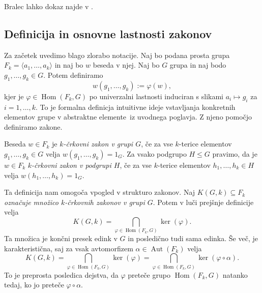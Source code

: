 Bralec lahko dokaz najde v \cite[str.~5--8]{Lyndon_Schupp_2015}.

\subsection{Definicija in osnovne lastnosti zakonov}\label{sec_osnovne_lastnosti_zakonov}

Za začetek uvedimo blago zlorabo notacije. Naj bo podana prosta grupa $F_k = \langle a_1, \ldots, a_k \rangle$ in naj bo $w$ beseda v njej.
Naj bo $G$ grupa in naj bodo $g_1, \ldots, g_k \in G$. Potem definiramo \begin{equation*}
    w(g_1, \ldots, g_k) := \varphi(w),
\end{equation*}
kjer je $\varphi \in \operatorname{Hom}(F_k, G)$ po univerzalni lastnosti induciran s slikami $a_i \mapsto g_i$ za $i = 1, \ldots, k$.
To je formalna definicja intuitivne ideje \glqq vstavljanja konkretnih elementov grupe v abstraktne elemente\grqq~iz uvodnega poglavja. Z njeno pomočjo definiramo zakone.

\begin{definicija}\label{def_zakon_formalna}
    Beseda $w \in F_k$ je \emph{$k$-črkovni zakon v grupi $G$}, če za vse $k$-terice elementov $g_1, \ldots, g_k \in G$ velja $w(g_1, \ldots, g_k) = 1_G$.
    Za vsako podgrupo $H \le G$ pravimo, da je $w \in F_k$ \emph{$k$-črkovni zakon v podgrupi $H$}, če za vse $k$-terice elementov $h_1, \ldots, h_k \in H$ velja $w(h_1, \ldots, h_k) = 1_G$.
\end{definicija}

Ta definicija nam omogoča vpogled v strukturo zakonov. Naj \emph{$K(G, k) \subseteq F_k$ označuje množico $k$-črkovnih zakonov v grupi $G$}. Potem v luči prejšnje definicije velja
\begin{equation*}
K(G, k)  = \bigcap_{\varphi \in \operatorname{Hom}(F_k, G)} \ker(\varphi).   
\end{equation*}  
Ta množica je končni presek edink v $G$ in posledično tudi sama edinka. Še več, je karakteristična, saj za vsak avtomorfizem $\alpha \in \operatorname{Aut}(F_k)$ velja
\begin{equation*}
    K(G, k)  = \bigcap_{\varphi \in \operatorname{Hom}(F_k, G)} \ker(\varphi) = \bigcap_{\varphi \in \operatorname{Hom}(F_k, G)} \ker(\varphi \circ \alpha). 
\end{equation*}  
To je preprosta posledica dejstva, da $\varphi$ preteče grupo $\operatorname{Hom}(F_k, G)$ natanko tedaj, ko jo preteče $\varphi \circ \alpha$.     

